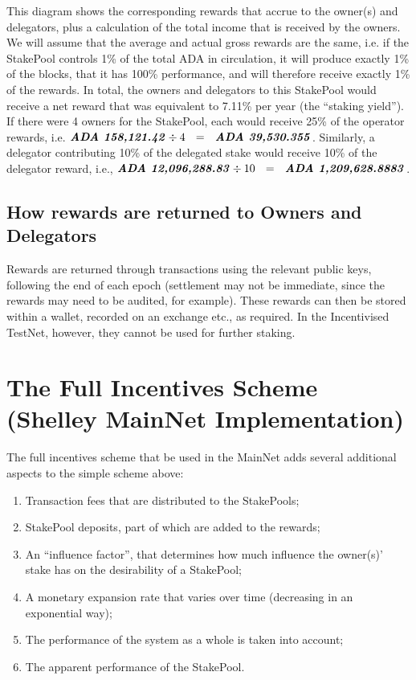 \documentclass[11pt,a4paper,dvipsnames,twosided,final]{article}
\newcommand{\khcomment}[1]{\todo[color=blue!20]{KH: #1}}
\newcommand{\ada}{ADA{}}
\newcommand{\ADA}[1]{\textbf{\emph{\ada~{#1}}}}
\begin{document}
\noindent
This diagram shows the corresponding rewards that accrue to the owner(s) and delegators,
plus a calculation of the total income that is received by the owners.  We will assume that the average
and actual gross rewards are the same, i.e. if the StakePool controls 1\% of the total \ada{} in
circulation, it will produce exactly 1\% of the blocks, that it has 100\% performance, and will therefore receive exactly 1\% of the rewards.
In total, the
owners and delegators to this StakePool would receive a net reward that was equivalent to 7.11\% per year
(the ``staking yield'').  If there were 4 owners for the StakePool, each would receive
25\% of the operator rewards, i.e. $\ADA{158,121.42} \div 4 ~~=~~ \ADA{39,530.355}$.
Similarly, a delegator contributing 10\% of the delegated stake would receive 10\% of
the delegator reward, i.e., $\ADA{12,096,288.83} \div 10 ~~=~~ \ADA{1,209,628.8883}$.


\subsection{How rewards are returned to Owners and Delegators}
\label{sec:rewards-return}

Rewards are returned through transactions using the relevant public keys, following the end
of each epoch (settlement may not be immediate, since the rewards may need to be audited, for example).
These rewards can then be stored within a wallet, recorded on an exchange etc., as required.
In the Incentivised TestNet, however, they cannot be used for further staking.
\khcomment{JC/MG to expand}

\clearpage
\section{The Full Incentives  Scheme (Shelley MainNet Implementation)}
\label{sec:MainNet}

The full incentives scheme that  be used in the MainNet adds several additional aspects to the
simple scheme above:

\begin{enumerate}
\item
  Transaction fees that are distributed to the StakePools;
\item
  StakePool deposits, part of which are added to the rewards;
\item
  An ``influence factor'', that determines how much influence the owner(s)' stake has on
  the desirability of a StakePool;
\item
  A monetary expansion rate that varies over time (decreasing in an exponential way);
\item
  The performance of the system as a whole is taken into account;
\item
  The apparent performance of the StakePool.
\end{enumerate}
\end{document}
